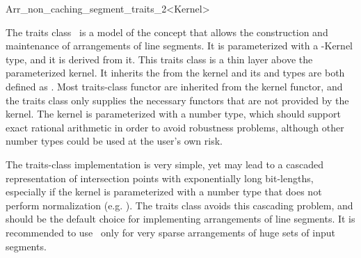 
\ccRefPageBegin

\begin{ccRefClass}{Arr_non_caching_segment_traits_2<Kernel>}
    
\ccDefinition 

The traits class \ccRefName\ is a model of the 
concept that allows the construction and maintenance of arrangements of
line segments. It is parameterized with a \cgal-Kernel type, and it
is derived from it. This traits class is a thin layer above the
parameterized kernel. It inherits the  from the kernel and its
 and  types are both defined as
. Most traits-class functor are inherited from the
kernel functor, and the traits class only supplies the necessary functors
that are not provided by the kernel. The kernel is parameterized with a
number type, which should support exact rational arithmetic in order to
avoid robustness problems, although other number types could be used at the
user's own risk.

The traits-class implementation is very simple, yet may lead to
a cascaded representation of intersection points with exponentially long
bit-lengths, especially if the kernel is parameterized with a number type
that does not perform normalization (e.g. ).
The  traits class avoids this cascading
problem, and should be the default choice for implementing arrangements of
line segments. It is recommended to use \ccRefName\ only for very sparse
arrangements of huge sets of input segments.
    
 
\ccIsModel
     \\
     \\

\ccInheritsFrom

\ccSeeAlso

\end{ccRefClass}
\ccRefPageEnd
